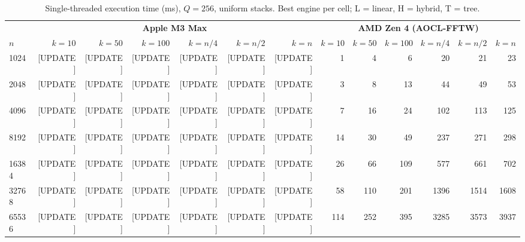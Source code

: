 \documentclass[11pt]{article}
\begin{document}
\begin{table}[t]
\centering
\caption{Single-threaded execution time (ms), $Q = 256$, uniform stacks.
  Best engine per cell; L = linear, H = hybrid, T = tree.}
\label{tab:serial}
\begin{tabular}{@{}l rrrrrr rrrrrr@{}}
\toprule
& \multicolumn{6}{c}{\textbf{Apple M3 Max}} &
  \multicolumn{6}{c}{\textbf{AMD Zen 4 (AOCL-FFTW)}} \\
\cmidrule(lr){2-7} \cmidrule(lr){8-13}
$n$ & $k{=}10$ & $k{=}50$ & $k{=}100$ & $k{=}n/4$ & $k{=}n/2$ & $k{=}n$
    & $k{=}10$ & $k{=}50$ & $k{=}100$ & $k{=}n/4$ & $k{=}n/2$ & $k{=}n$ \\
\midrule
1024  & [UPDATE] & [UPDATE] & [UPDATE] & [UPDATE] & [UPDATE] & [UPDATE]
      & 1 & 4 & 6 & 20 & 21 & 23 \\
2048  & [UPDATE] & [UPDATE] & [UPDATE] & [UPDATE] & [UPDATE] & [UPDATE]
      & 3 & 8 & 13 & 44 & 49 & 53 \\
4096  & [UPDATE] & [UPDATE] & [UPDATE] & [UPDATE] & [UPDATE] & [UPDATE]
      & 7 & 16 & 24 & 102 & 113 & 125 \\
8192  & [UPDATE] & [UPDATE] & [UPDATE] & [UPDATE] & [UPDATE] & [UPDATE]
      & 14 & 30 & 49 & 237 & 271 & 298 \\
16384 & [UPDATE] & [UPDATE] & [UPDATE] & [UPDATE] & [UPDATE] & [UPDATE]
      & 26 & 66 & 109 & 577 & 661 & 702 \\
32768 & [UPDATE] & [UPDATE] & [UPDATE] & [UPDATE] & [UPDATE] & [UPDATE]
      & 58 & 110 & 201 & 1396 & 1514 & 1608 \\
65536 & [UPDATE] & [UPDATE] & [UPDATE] & [UPDATE] & [UPDATE] & [UPDATE]
      & 114 & 252 & 395 & 3285 & 3573 & 3937 \\
\bottomrule
\end{tabular}
\end{table}
\end{document}
